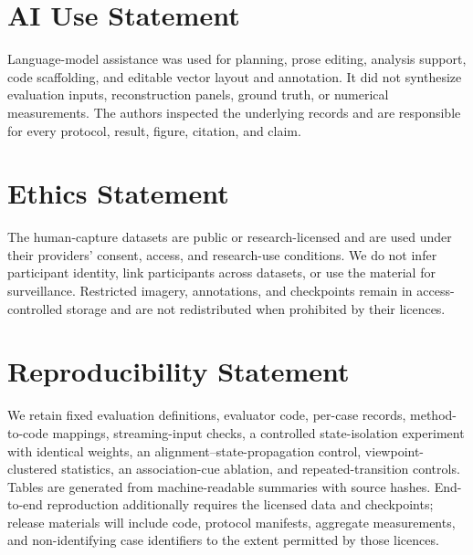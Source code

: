 \section*{AI Use Statement}

Language-model assistance was used for planning, prose editing, analysis
support, code scaffolding, and editable vector layout and annotation. It did
not synthesize evaluation inputs, reconstruction panels, ground truth, or
numerical measurements. The authors inspected the underlying records and are
responsible for every protocol, result, figure, citation, and claim.

\section*{Ethics Statement}

The human-capture datasets are public or research-licensed and are used under
their providers' consent, access, and research-use conditions. We do not infer
participant identity, link participants across datasets, or use the material
for surveillance. Restricted imagery, annotations, and checkpoints remain in
access-controlled storage and are not redistributed when prohibited by their
licences.

\section*{Reproducibility Statement}

We retain fixed evaluation definitions, evaluator code, per-case records,
method-to-code mappings, streaming-input checks, a controlled state-isolation
experiment with identical weights, an alignment--state-propagation control,
viewpoint-clustered statistics, an association-cue ablation, and
repeated-transition controls. Tables are
generated from machine-readable summaries with source hashes. End-to-end
reproduction additionally requires the licensed data and checkpoints; release
materials will include code, protocol manifests, aggregate measurements, and
non-identifying case identifiers to the extent permitted by those licences.
